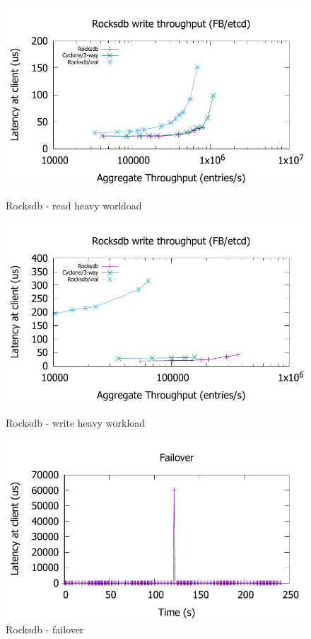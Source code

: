 \documentclass[pageno]{jpaper}
\begin{document}
\begin{figure}
\begin{minipage}{0.33\textwidth}
\includegraphics[scale=0.45]{results2/fb.pdf}
\caption{Rocksdb - read heavy workload}
\label{fig:fb}
\end{minipage}
\begin{minipage}{0.33\textwidth}
  \includegraphics[scale=0.45]{results2/fb2.pdf}
  \caption{Rocksdb - write heavy workload}
  \label{fig:fb2}
\end{minipage}
\begin{minipage}{0.33\textwidth}
  \includegraphics[scale=0.45]{results2/failover.pdf}
  \caption{Rocksdb - failover}
  \label{fig:timeline}
\end{minipage}
\end{figure}
\end{document}
